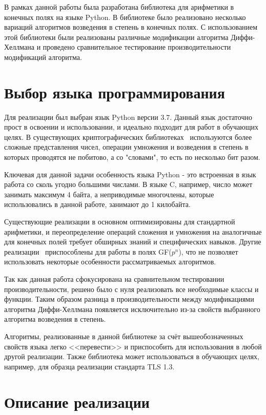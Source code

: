 \documentclass[times,specification,annotation]{itmo-student-thesis}
\begin{document}
В рамках данной работы была разработана библиотека для арифметики в конечных полях на языке Python.
В библиотеке было реализовано несколько вариаций алгоритмов возведения в степень в конечных полях.
С использованием этой библиотеки были реализованы различные модификации алгоритма Диффи-Хеллмана и
проведено сравнительное тестирование производительности модификаций алгоритма.

\section{Выбор языка программирования}\label{sec:prog}

Для реализации был выбран язык Python версии 3.7.
Данный язык достаточно прост в освоении и использовании, и идеально подходит для работ в обучающих целях.
В существующих криптографических библиотеках~\cite{openssl} используются более сложные представления чисел,
операции умножения и возведения в степень в которых проводятся не побитово, а со "словами", то есть по несколько бит разом.

Ключевая для данной задачи особенность языка Python - это встроенная в язык работа со сколь угодно большими числами.
В языке C, например, число может занимать максимум 4 байта, а неприводимые многочлены, которые использовались
в данной работе, занимают до 1 килобайта.

Существующие реализации  в основном оптимизированы для стандартной арифметики, и переопределение операций
сложения и умножения на аналогичные для конечных полей требует обширных знаний и специфических навыков.
Другие реализации~\cite{pri16} приспособлены для работы в полях GF($p^n$), что не позволяет использовать
некоторые особенности рассматриваемых алгоритмов.

Так как данная работа сфокусирована на сравнительном тестировании производительности, решено было с нуля
реализовать все необходимые классы и функции.
Таким образом разница в производительности между модификациями алгоритма Диффи-Хеллмана появляется исключительно
из-за свойств выбранного алгоритма возведения в степень.

Алгоритмы, реализованные в данной библиотеке за счёт вышеобозначенных свойств языка легко <<перевести>> и приспособить для
использования в любой другой реализации.
Также библиотека может использоваться в обучающих целях, например, для образца реализации стандарта TLS 1.3.

\section{Описание реализации}\label{sec:impl}
\end{document}
